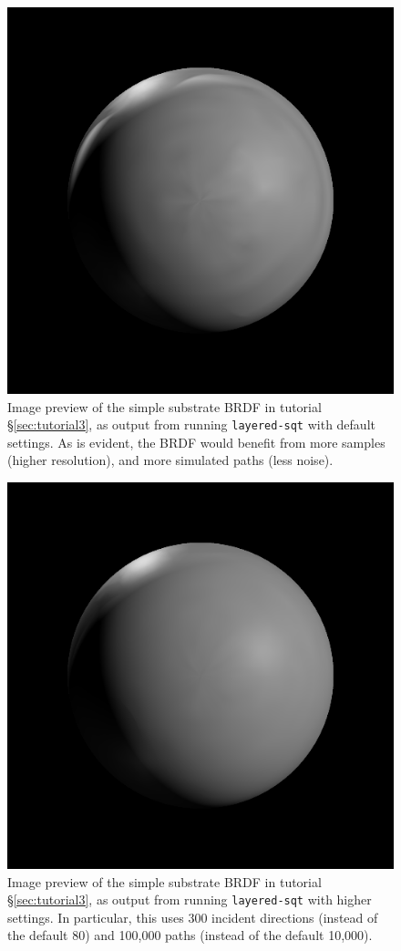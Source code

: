 \documentclass[
    twoside,
    twocolumn,
    letterpaper,
    10pt]{article}
\begin{document}
\begin{figure}
\begin{center}
    \includegraphics[width=0.75\columnwidth]{tutorial3-1.png}
    \caption{Image preview of the simple substrate BRDF in tutorial 
    \S\ref{sec:tutorial3}, as output from running \texttt{layered-sqt} with
    default settings. As is evident, the BRDF would benefit from more
    samples (higher resolution), and more simulated paths (less noise).
    \label{fig:tutorial3-1}}
\end{center}
\end{figure}

\begin{figure}
\begin{center}
    \includegraphics[width=0.75\columnwidth]{tutorial3-2.png}
    \caption{Image preview of the simple substrate BRDF in tutorial
    \S\ref{sec:tutorial3}, as output from running \texttt{layered-sqt} with
    higher settings. In particular, this uses 300 incident directions (instead
    of the default 80) and 100,000 paths (instead of the default 10,000).
    \label{fig:tutorial3-2}}
\end{center}
\end{figure}
\end{document}
